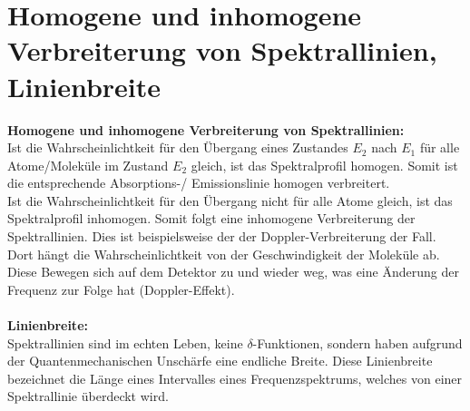 \section{Homogene und inhomogene Verbreiterung von Spektrallinien, Linienbreite}
\textbf{Homogene und inhomogene Verbreiterung von Spektrallinien:}\\
Ist die Wahrscheinlichtkeit für den Übergang eines Zustandes $E_2$ nach $E_1$ für alle Atome/Moleküle im Zustand $E_2$ gleich, ist das Spektralprofil homogen.
Somit ist die entsprechende Absorptions-/ Emissionslinie homogen verbreitert.\\
Ist die Wahrscheinlichtkeit für den Übergang nicht für alle Atome gleich, ist das Spektralprofil inhomogen.
Somit folgt eine inhomogene Verbreiterung der Spektrallinien.
Dies ist beispielsweise der der Doppler-Verbreiterung der Fall.
Dort hängt die Wahrscheinlichtkeit von der Geschwindigkeit der Moleküle ab.
Diese Bewegen sich auf dem Detektor zu und wieder weg, was eine Änderung der Frequenz zur Folge hat (Doppler-Effekt).\\\\
\textbf{Linienbreite:}\\
Spektrallinien sind im echten Leben, keine $\delta$-Funktionen, sondern haben aufgrund der Quantenmechanischen Unschärfe eine endliche Breite.
Diese Linienbreite bezeichnet die Länge eines Intervalles eines Frequenzspektrums, welches von einer Spektrallinie überdeckt wird.
